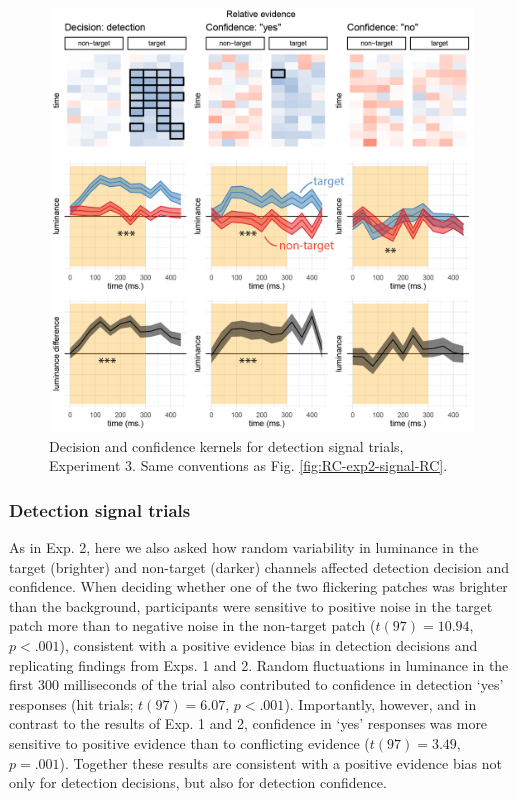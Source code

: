 \documentclass[12pt,twoside]{reedthesis}
\begin{document}
\begin{figure}
\includegraphics[width=\textwidth]{figure/RC/RC-exp3-signal-RC-enhanced} \caption[Decision kernels in detection signal trials, Exp. 3]{Decision and confidence kernels for detection signal trials, Experiment 3. Same conventions as Fig. \ref{fig:RC-exp2-signal-RC}.}\label{fig:RC-exp3-signal-RC}
\end{figure}
\hypertarget{detection-signal-trials-2}{%
\subsubsection{Detection signal trials}\label{detection-signal-trials-2}}

As in Exp. 2, here we also asked how random variability in luminance in the target (brighter) and non-target (darker) channels affected detection decision and confidence. When deciding whether one of the two flickering patches was brighter than the background, participants were sensitive to positive noise in the target patch more than to negative noise in the non-target patch (\(t(97) = 10.94\), \(p < .001\)), consistent with a positive evidence bias in detection decisions and replicating findings from Exps. 1 and 2. Random fluctuations in luminance in the first 300 milliseconds of the trial also contributed to confidence in detection `yes' responses (hit trials; \(t(97) = 6.07\), \(p < .001\)). Importantly, however, and in contrast to the results of Exp. 1 and 2, confidence in `yes' responses was more sensitive to positive evidence than to conflicting evidence (\(t(97) = 3.49\), \(p = .001\)). Together these results are consistent with a positive evidence bias not only for detection decisions, but also for detection confidence.
\end{document}
